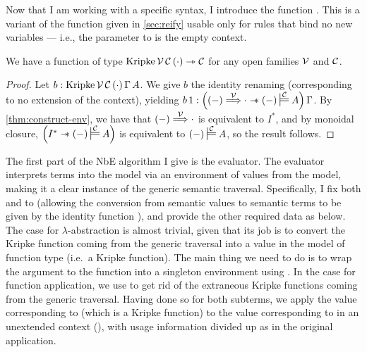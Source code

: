 Now that I am working with a specific syntax, I introduce the function
.
This is a variant of the  function given in \cref{sec:reify}
usable only for rules that bind no new variables --- i.e., the parameter
\AgdaBound{$\Delta$} to  is the empty context.

\begin{lemma}
  We have a function of type
  $\mathrm{Kripke}\,\V\,\C\,\plr{\cdot} \rightarrowtriangle \C$ for any open
  families $\V$ and $\C$.
\end{lemma}
\begin{proof}
  Let $b : \mathrm{Kripke}\,\V\,\C\,\plr{\cdot}\,\Gamma\,A$.
  We give $b$ the identity renaming (corresponding to no extension of the
  context), yielding
  $b\,1 : \plr{\plr{-} \env\V {\cdot} \wand \plr{-} \sdtstile{}\C A}\,\Gamma$.
  By \cref{thm:construct-env}, we have that $\plr{-} \env\V {\cdot}$ is
  equivalent to $I^*$, and by monoidal closure,
  $\plr{I^* \wand \plr{-} \sdtstile{}\C A}$ is equivalent to
  $\plr{-} \sdtstile{}\C A$, so the result follows.
\end{proof}

The first part of the NbE algorithm I give is the evaluator.
The evaluator interprets terms into the model via an environment of values from
the model, making it a clear instance of the generic semantic traversal.
Specifically, I fix both \AgdaBound{$\V$} and \AgdaBound{$\C$} to
\AgdaFunction{\_$\vDash$\_} (allowing the conversion from semantic values to
semantic terms to be given by the identity function ), and
provide the other required data as below.
The case for $\lambda$-abstraction is almost trivial, given that its job is to
convert the Kripke function  coming from the generic traversal into
a value in the model of function type (i.e.\ a Kripke function).
The main thing we need to do is to wrap the argument to the function into a
singleton environment using .
In the case for function application, we use  to get rid of
the extraneous Kripke functions coming from the generic traversal.
Having done so for both subterms, we apply the value corresponding to
 (which is a Kripke function) to the value corresponding to
 in an unextended context (), with usage
information divided up as in the original application.


